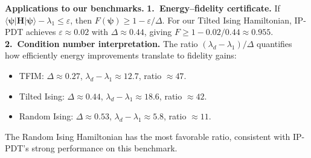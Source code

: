 \documentclass[11pt]{article}
\theoremstyle{plain}
\theoremstyle{plain}
\begin{document}
\medskip\noindent\textbf{Applications to our benchmarks.}
\noindent\textbf{1.\ Energy--fidelity certificate.}
If $\langle\boldsymbol{\psi}|\mathbf{H}|\boldsymbol{\psi}\rangle-\lambda_1\le\varepsilon$, then
$F(\boldsymbol{\psi})\ge 1-\varepsilon/\Delta$.  For our Tilted Ising Hamiltonian,
IP-PDT achieves $\varepsilon\approx 0.02$ with $\Delta\approx 0.44$,
giving $F\ge 1-0.02/0.44\approx 0.955$.
\noindent\textbf{2.\ Condition number interpretation.}
The ratio $(\lambda_d-\lambda_1)/\Delta$ quantifies how efficiently
energy improvements translate to fidelity gains:
\begin{itemize}[leftmargin=1.5em]
  \item TFIM: $\Delta\approx 0.27$,
    $\lambda_d-\lambda_1\approx 12.7$, ratio $\approx 47$.
  \item Tilted Ising: $\Delta\approx 0.44$,
    $\lambda_d-\lambda_1\approx 18.6$, ratio $\approx 42$.
  \item Random Ising: $\Delta\approx 0.53$,
    $\lambda_d-\lambda_1\approx 5.8$, ratio $\approx 11$.
\end{itemize}
The Random Ising Hamiltonian has the most favorable ratio, consistent
with IP-PDT's strong performance on this benchmark.
\end{document}
